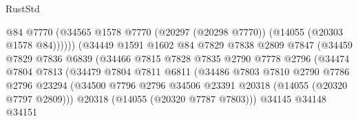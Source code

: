 \begin{lexlean}{RustStd}
\begin{coremodule}
                                        @84
                                        @7770
                                        (@34565
                                          @1578
                                          @7770
                                          (@20297 (@20298 @7770))
                                          (@14055 (@20303 @1578 @84))))))
                                  (@34449
                                    @1591
                                    @1602
                                    @84
                                    @7829
                                    @7838
                                    @2809
                                    @7847
                                    (@34459
                                      @7829
                                      @7836
                                      @6839
                                      (@34466
                                        @7815
                                        @7828
                                        @7835
                                        @2790
                                        @7778
                                        @2796
                                        (@34474
                                          @7804
                                          @7813
                                          (@34479
                                            @7804
                                            @7811
                                            @6811
                                            (@34486
                                              @7803
                                              @7810
                                              @2790
                                              @7786
                                              @2796
                                              @23294
                                              (@34500
                                                @7796
                                                @2796
                                                @34506
                                                @23391
                                                @20318
                                                (@14055 (@20320 @7797 @2809)))
                                              @20318
                                              (@14055 (@20320 @7787 @7803)))
                                            @34145
                                            @34148
                                            @34151

\end{coremodule}
\end{lexlean}
